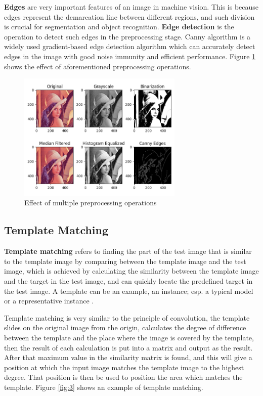 \textbf{Edges} are very important features of an image in machine vision. This is because edges represent the demarcation line between different regions, and such division is crucial for segmentation and object recognition. \textbf{Edge detection} is the operation to detect such edges in the preprocessing stage. Canny algorithm \cite{canny_computational_1986} is a widely used gradient-based edge detection algorithm which can accurately detect edges in the image with good noise immunity and efficient performance. Figure \ref{fig:2} shows the effect of aforementioned preprocessing operations. 

\begin{figure}[h]
  \centering
  \includegraphics[width=0.7\textwidth]{Figures/Image Preprocessing.png}
  \caption{Effect of multiple preprocessing operations}
  \label{fig:2}
\end{figure}

\subsection{Template Matching}

\textbf{Template matching} refers to finding the part of the test image that is similar to the template image by comparing between the template image and the test image, which is achieved by calculating the similarity between the template image and the target in the test image, and can quickly locate the predefined target in the test image. A template can be an example, an instance; esp. a typical model or a representative instance  \cite{brunelli2009template}.

Template matching is very similar to the principle of convolution, the template slides on the original image from the origin, calculates the degree of difference between the template and the place where the image is covered by the template, then the result of each calculation is put into a matrix and output as the result. After that maximum value in the similarity matrix is found, and this will give a position at which the input image matches the template image to the highest degree. That position is then be used to position the area which matches the template. Figure \ref{fig:3} shows an example of template matching.

